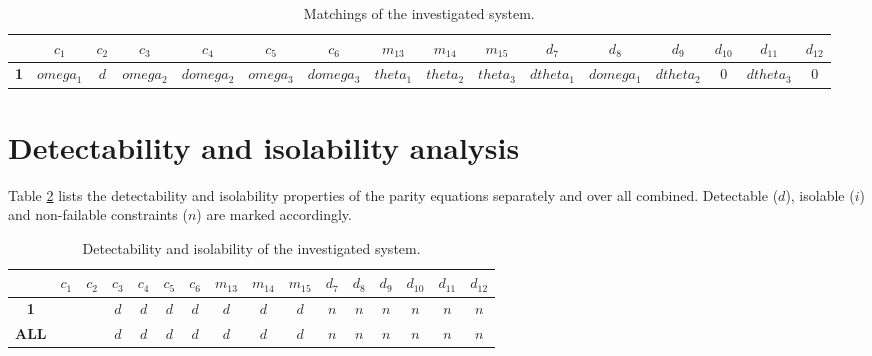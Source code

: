 \documentclass[a4,11pt]{article}
\begin{document}
\begin{table}[!htb]
\centering
\normalsize
\begin{tabular}{|c|c|c|c|c|c|c|c|c|c|c|c|c|c|c|c|}
\hline
~ & \textbf{$c_1$} & \textbf{$c_2$} & \textbf{$c_3$} & \textbf{$c_4$} & \textbf{$c_5$} & \textbf{$c_6$} & \textbf{$m_{13}$} & \textbf{$m_{14}$} & \textbf{$m_{15}$} & \textbf{$d_7$} & \textbf{$d_8$} & \textbf{$d_9$} & \textbf{$d_{10}$} & \textbf{$d_{11}$} & \textbf{$d_{12}$}\\ \hline 
\textbf{1} & $omega_1$ & $d$ & $omega_2$ & $domega_2$ & $omega_3$ & $domega_3$ & $theta_1$ & $theta_2$ & $theta_3$ & $dtheta_1$ & $domega_1$ & $dtheta_2$ & 0 & $dtheta_3$ & 0\\ \hline 
\end{tabular}
\caption{Matchings of the investigated system.}
\label{tab:matchings}
\end{table}

\section{Detectability and isolability analysis}
Table \ref{tab:iso} lists the detectability and isolability properties of the parity equations separately and over all combined. Detectable (\textbf{$d$}), isolable (\textbf{$i$}) and non-failable constraints (\textbf{$n$}) are marked accordingly.\setlength\tabcolsep{2mm}

\begin{table}[!htb]
\centering
\normalsize
\begin{tabular}{|c|c|c|c|c|c|c|c|c|c|c|c|c|c|c|c|}
\hline
~ & \textbf{$c_1$} & \textbf{$c_2$} & \textbf{$c_3$} & \textbf{$c_4$} & \textbf{$c_5$} & \textbf{$c_6$} & \textbf{$m_{13}$} & \textbf{$m_{14}$} & \textbf{$m_{15}$} & \textbf{$d_7$} & \textbf{$d_8$} & \textbf{$d_9$} & \textbf{$d_{10}$} & \textbf{$d_{11}$} & \textbf{$d_{12}$}\\ \hline 
\textbf{1} &  &  & $d$ & $d$ & $d$ & $d$ & $d$ & $d$ & $d$ & $n$ & $n$ & $n$ & $n$ & $n$ & $n$\\ \hline 
\textbf{ALL} &  &  & $d$ & $d$ & $d$ & $d$ & $d$ & $d$ & $d$ & $n$ & $n$ & $n$ & $n$ & $n$ & $n$\\ \hline 
\end{tabular}
\caption{Detectability and isolability of the investigated system.}
\label{tab:iso}
\end{table}
\end{document}
